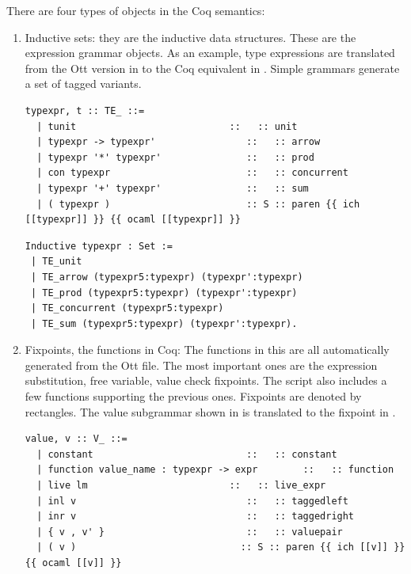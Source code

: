 \documentclass[12pt,twoside,notitlepage]{report}
\begin{document}
There are four types of objects in the Coq semantics:
\begin{enumerate}
\item{Inductive sets: they are the inductive data structures. These are the expression grammar objects. As an example, type expressions are translated from the Ott version in  to the Coq equivalent in . Simple grammars generate a set of tagged variants. 



\begin{lstlisting}[language={Ott}, caption={Ott type expressions}, label={lst:otttypexpr}]
typexpr, t :: TE_ ::=
  | tunit                           ::   :: unit
  | typexpr -> typexpr'                ::   :: arrow
  | typexpr '*' typexpr'               ::   :: prod
  | con typexpr                        ::   :: concurrent
  | typexpr '+' typexpr'               ::   :: sum
  | ( typexpr )                        :: S :: paren {{ ich [[typexpr]] }} {{ ocaml [[typexpr]] }}
\end{lstlisting}


\begin{minipage}{\linewidth}

\begin{lstlisting}[language={Coq},caption={Coq type expr}, label={lst:coqtypexpr}]
Inductive typexpr : Set := 
 | TE_unit
 | TE_arrow (typexpr5:typexpr) (typexpr':typexpr)
 | TE_prod (typexpr5:typexpr) (typexpr':typexpr)
 | TE_concurrent (typexpr5:typexpr)
 | TE_sum (typexpr5:typexpr) (typexpr':typexpr).
\end{lstlisting}

\end{minipage}
}
\item{Fixpoints, the functions in Coq: The functions in this are all automatically generated from the Ott file. The most important ones are the expression substitution, free variable, value check fixpoints. The script also includes a few functions supporting the previous ones. Fixpoints are denoted by rectangles. The value subgrammar shown in  is translated to the fixpoint in . 


\begin{lstlisting}[language={Ott}, caption={Ott value subgrammar}, label={lst:ottvaluesub}]
value, v :: V_ ::=
  | constant                           ::   :: constant
  | function value_name : typexpr -> expr        ::   :: function
  | live lm                         ::   :: live_expr
  | inl v                              ::   :: taggedleft
  | inr v                              ::   :: taggedright
  | { v , v' }                         ::   :: valuepair
  | ( v )                             :: S :: paren {{ ich [[v]] }} {{ ocaml [[v]] }}
\end{lstlisting}


}
\end{enumerate}
\end{document}
